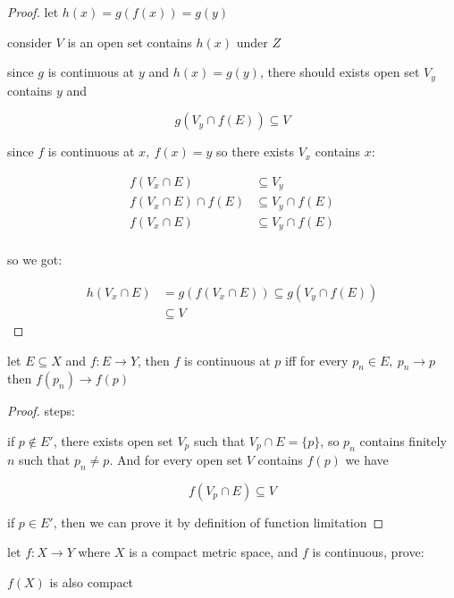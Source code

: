 \begin{proof}
    let $h(x) = g (f(x)) = g(y)$

    consider $V$ is an open set contains $h(x)$ under $Z$

    since $g$ is continuous at $y$ and $h(x) = g(y)$, there should exists open set $V_y$ contains $y$ and

    \[
        g(V_y \cap f(E)) \subseteq V
    \]

    since $f$ is continuous at $x,\: f(x) = y$ so there exists $V_x$ contains $x$:

    \begin{align*}
        f(V_x \cap E) &\subseteq V_y \\
        f(V_x \cap E) \cap f(E) &\subseteq V_y \cap f(E) \\
        f(V_x \cap E) &\subseteq V_y \cap f(E) \\
    \end{align*}

    so we got:

    \begin{align*}
        h(V_x \cap E) &= g(f(V_x \cap E)) \subseteq g(V_y \cap f(E)) \\
        & \subseteq V
    \end{align*}
\end{proof}

\begin{thm}
    let $E \subseteq X$ and $f:E \to Y$, then $f$ is continuous at $p$ iff for every $p_n \in E,\: p_n \to p$
    then $f(p_n) \to f(p)$
\end{thm}

\begin{proof}
steps:

    if $p \notin E'$, there exists open set $V_p$ such that $V_p \cap E = \{ p \}$, so $p_n$ contains finitely $n$
    such that $p_n \ne p$. And for every open set $V$ contains $f(p)$ we have

    \[
        f(V_p \cap E) \subseteq V
    \]

    if $p \in E'$, then we can prove it by definition of function limitation 

\end{proof}

\begin{exercise}
    let $f: X \to Y$ where $X$ is a compact metric space, and $f$ is continuous, prove:

    $f(X)$ is also compact
\end{exercise}

